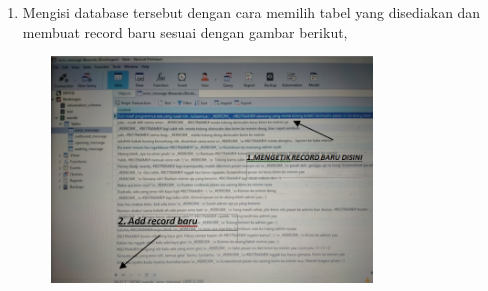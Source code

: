 \documentclass[a4paper, 12 pt]{article}
\newcounter{saveenumi}
\newcommand{\seti}{\setcounter{saveenumi}{\value{enumi}}} %
\begin{document}
\begin{enumerate}
\begin{center}
	            \end{center}
            \item Mengisi database tersebut dengan cara memilih tabel yang disediakan dan membuat record baru sesuai dengan gambar berikut,
                \begin{center}
		        \includegraphics[width=10cm,height=6cm]{tutorial}
	            \end{center}
            \seti %
        \end{enumerate}
\end{document}
